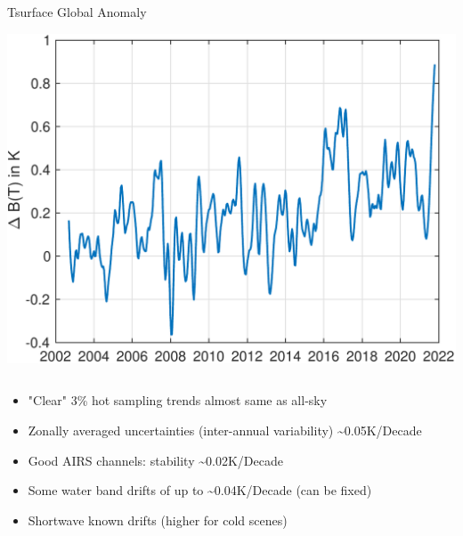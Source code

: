 \documentclass[10pt,t]{beamer}
\begin{document}
\begin{frame}
\begin{columns}
\begin{column}{0.5\columnwidth}
\begin{block}{\footnotesize Tsurface Global Anomaly}
\vspace{-0.05in}
\begin{center}
\includegraphics[width=\linewidth]{SunClimate2022/global_bt1231_anomaly.pdf}
\end{center}
\end{block}
\end{column}
\end{columns}

\vspace{-0.1in}
\small
\begin{itemize}
\item "Clear" 3\% hot sampling trends almost same as all-sky
\item Zonally averaged uncertainties (inter-annual variability) \textasciitilde{}0.05K/Decade
\item Good AIRS channels: stability \textasciitilde{}0.02K/Decade
\item Some water band drifts of up to \textasciitilde{}0.04K/Decade (can be fixed)
\item Shortwave known drifts (higher for cold scenes)
\end{itemize}
\end{frame}
\end{document}
